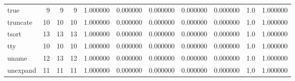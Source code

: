 \begin{longtable}{lrrrrrrrrrr}
true      &                                       9 &                  9 &                                 9 &                                   1.000000 &                               0.000000 &                                     0.000000 &                          0.000000 &                                0.000000 &                                1.0 &                                           1.000000 \\
truncate  &                                      10 &                 10 &                                10 &                                   1.000000 &                               0.000000 &                                     0.000000 &                          0.000000 &                                0.000000 &                                1.0 &                                           1.000000 \\
tsort     &                                      13 &                 13 &                                13 &                                   1.000000 &                               0.000000 &                                     0.000000 &                          0.000000 &                                0.000000 &                                1.0 &                                           1.000000 \\
tty       &                                      10 &                 10 &                                10 &                                   1.000000 &                               0.000000 &                                     0.000000 &                          0.000000 &                                0.000000 &                                1.0 &                                           1.000000 \\
uname     &                                      12 &                 13 &                                12 &                                   1.000000 &                               0.000000 &                                     0.000000 &                          0.000000 &                                0.000000 &                                1.0 &                                           1.000000 \\
unexpand  &                                      11 &                 11 &                                11 &                                   1.000000 &                               0.000000 &                                     0.000000 &                          0.000000 &                                0.000000 &                                1.0 &                                           1.000000 \\

\end{longtable}
